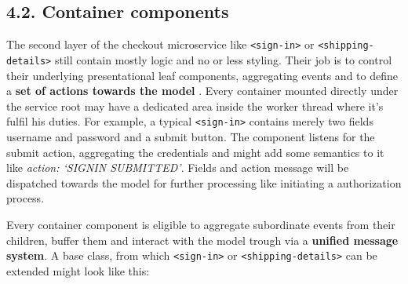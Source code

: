 \documentclass[]{article}
\newenvironment{Shaded}{}{}
\newcommand{\KeywordTok}[1]{\textcolor[rgb]{0.00,0.44,0.13}{\textbf{{#1}}}}
\newcommand{\DataTypeTok}[1]{\textcolor[rgb]{0.56,0.13,0.00}{{#1}}}
\newcommand{\SpecialCharTok}[1]{\textcolor[rgb]{0.25,0.44,0.63}{{#1}}}
\newcommand{\StringTok}[1]{\textcolor[rgb]{0.25,0.44,0.63}{{#1}}}
\newcommand{\VerbatimStringTok}[1]{\textcolor[rgb]{0.25,0.44,0.63}{{#1}}}
\newcommand{\CommentTok}[1]{\textcolor[rgb]{0.38,0.63,0.69}{\textit{{#1}}}}
\newcommand{\VariableTok}[1]{\textcolor[rgb]{0.10,0.09,0.49}{{#1}}}
\newcommand{\OperatorTok}[1]{\textcolor[rgb]{0.40,0.40,0.40}{{#1}}}
\newcommand{\AttributeTok}[1]{\textcolor[rgb]{0.49,0.56,0.16}{{#1}}}
\newcommand{\NormalTok}[1]{{#1}}
\begin{document}
\subsection{4.2. Container components}\label{container-components}

The second layer of the checkout microservice like
\texttt{\textless{}sign-in\textgreater{}} or
\texttt{\textless{}shipping-details\textgreater{}} still contain mostly
logic and no or less styling. Their job is to control their underlying
presentational leaf components, aggregating events and to define a
\textbf{set of actions towards the model} . Every container mounted
directly under the service root may have a dedicated area inside the
worker thread where it's fulfil his duties. For example, a typical
\texttt{\textless{}sign-in\textgreater{}} contains merely two fields
username and password and a submit button. The component listens for the
submit action, aggregating the credentials and might add some semantics
to it like \emph{action: `SIGNIN SUBMITTED'}. Fields and action message
will be dispatched towards the model for further processing like
initiating a authorization process.

Every container component is eligible to aggregate subordinate events
from their children, buffer them and interact with the model trough via
a \textbf{unified message system}. A base class, from which
\texttt{\textless{}sign-in\textgreater{}} or
\texttt{\textless{}shipping-details\textgreater{}} can be extended might
look like this:

\begin{Shaded}
\end{Shaded}
\end{document}
